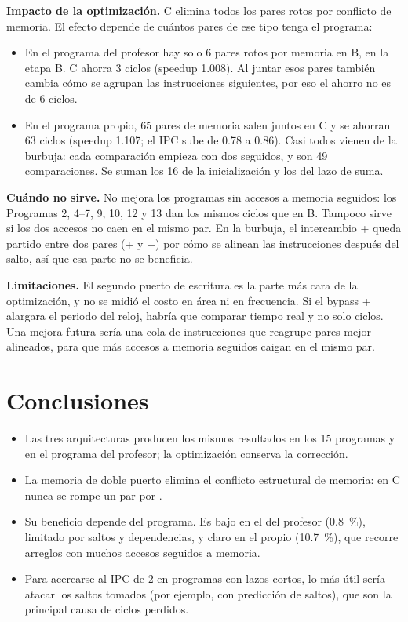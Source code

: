 \documentclass[11pt,a4paper]{article}
\newcommand{\sig}[1]{\texttt{\detokenize{#1}}}
\begin{document}
\textbf{Impacto de la optimización.} C elimina todos los pares rotos por conflicto de memoria. El efecto depende de cuántos pares de ese tipo tenga el programa:
\begin{itemize}
  \item En el programa del profesor hay solo 6 pares rotos por memoria en B, en la etapa B. C ahorra 3 ciclos (speedup 1.008). Al juntar esos pares también cambia cómo se agrupan las instrucciones siguientes, por eso el ahorro no es de 6 ciclos.
  \item En el programa propio, 65 pares de memoria salen juntos en C y se ahorran 63 ciclos (speedup 1.107; el IPC sube de 0.78 a 0.86). Casi todos vienen de la burbuja: cada comparación empieza con dos \sig{lw} seguidos, y son 49 comparaciones. Se suman los 16 \sig{sw} de la inicialización y los \sig{lw} del lazo de suma.
\end{itemize}

\textbf{Cuándo no sirve.} No mejora los programas sin accesos a memoria seguidos: los Programas 2, 4--7, 9, 10, 12 y 13 dan los mismos ciclos que en B. Tampoco sirve si los dos accesos no caen en el mismo par. En la burbuja, el intercambio \sig{sw}+\sig{sw} queda partido entre dos pares (\sig{beq}+\sig{sw} y \sig{sw}+\sig{addi}) por cómo se alinean las instrucciones después del salto, así que esa parte no se beneficia.

\textbf{Limitaciones.} El segundo puerto de escritura es la parte más cara de la optimización, y no se midió el costo en área ni en frecuencia. Si el bypass \sig{sw}+\sig{lw} alargara el periodo del reloj, habría que comparar tiempo real y no solo ciclos. Una mejora futura sería una cola de instrucciones que reagrupe pares mejor alineados, para que más accesos a memoria seguidos caigan en el mismo par.

\section{Conclusiones}

\begin{itemize}
  \item Las tres arquitecturas producen los mismos resultados en los 15 programas y en el programa del profesor; la optimización conserva la corrección.
  \item La memoria de doble puerto elimina el conflicto estructural de memoria: en C nunca se rompe un par por \sig{MemConflict}.
  \item Su beneficio depende del programa. Es bajo en el del profesor (0.8~\%), limitado por saltos y dependencias, y claro en el propio (10.7~\%), que recorre arreglos con muchos accesos seguidos a memoria.
  \item Para acercarse al IPC de 2 en programas con lazos cortos, lo más útil sería atacar los saltos tomados (por ejemplo, con predicción de saltos), que son la principal causa de ciclos perdidos.
\end{itemize}
\end{document}
